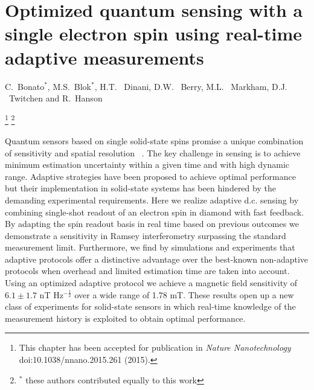 

\graphicspath{{./ch_adptv_msmnt_magnetometry/figures/}}


\chapter[Optimized quantum sensing using real-time adaptive measurements]{ Optimized quantum sensing with a single electron spin using real-time adaptive measurements}
\label{ch:AMM}

\begin{center} 
    \vspace{-1cm} {C.~Bonato$^*$, M.S.~Blok$^*$, H.T. ~Dinani, D.W. ~Berry, M.L. ~Markham, D.J. ~Twitchen  and R.~Hanson} 
\end{center}

{\renewcommand{\thefootnote}{}\footnote{This chapter has been accepted for publication in
    {\em Nature Nanotechnology} doi:10.1038/nnano.2015.261 (2015).}}
{\renewcommand{\thefootnote}{}\footnote{$^*$ these authors contributed equally to this work}}

\vspace{-0.5cm} 
Quantum sensors based on single solid-state spins promise a unique combination of sensitivity and spatial resolution ~\cite{Giovannetti_NatPhoton_2011,Higgins_Nature_2007,Degen_APL_2008,Taylor_NatPhys_2008,Maze_Nature_2008,Balasubramanian_Nature_2008,Balasubramanian_NatMater_2009,Dolde_NatPhys_2011,Acosta_Phys.Rev.Lett._2010,Toyli_PNAS_2013,Ovartchaiyapong_NatCommun_2014,LeSage_Nature_2013,Kaufmann_PNAS_2013,Kucsko_Nature_2013,Shi_Science_2015,Maletinsky_NatNano_2012,Staudacher_Science_2013,Mamin_Science_2013,Tetienne_Science_2014,Kolkowitz_Science_2015}. The key challenge in sensing is to achieve minimum estimation uncertainty within a given time and with high dynamic range. Adaptive strategies have been proposed to achieve optimal performance but their implementation in solid-state systems has been hindered by the demanding experimental requirements. Here we realize adaptive d.c. sensing by combining single-shot readout of an electron spin in diamond with fast feedback. By adapting the spin readout basis in real time based on previous outcomes we demonstrate a sensitivity in Ramsey interferometry surpassing the standard measurement limit. Furthermore, we find by simulations and experiments that adaptive protocols offer a distinctive advantage over the best-known non-adaptive protocols when overhead and limited estimation time are taken into account. Using an optimized adaptive protocol we achieve a magnetic field sensitivity of $6.1\pm 1.7$ nT Hz$^{-\frac{1}{2}}$ over a wide range of 1.78 mT. These results open up a new class of experiments for solid-state sensors in which real-time knowledge of the measurement history is exploited to obtain optimal performance.


